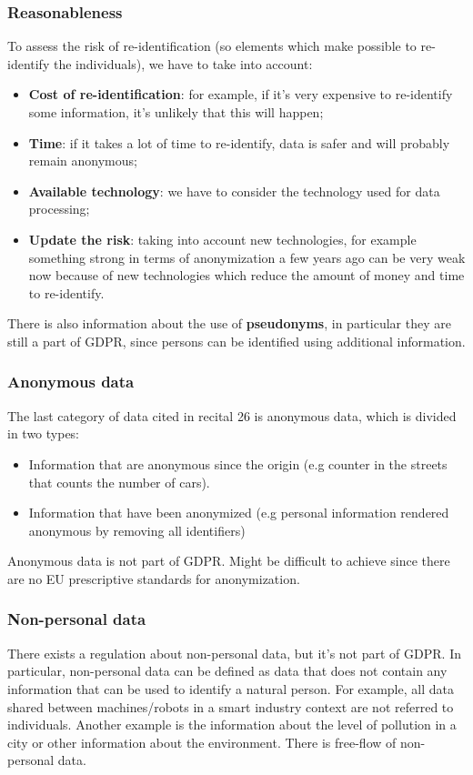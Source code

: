 \subsubsection{Reasonableness}
To assess the risk of re-identification (so elements which make possible to re-identify the individuals), we have to take into account:
\begin{itemize}
    \item \textbf{Cost of re-identification}: for example, if it’s very expensive to re-identify some information, it’s unlikely that this will happen;
    \item \textbf{Time}: if it takes a lot of time to re-identify, data is safer and will probably remain anonymous;
    \item \textbf{Available technology}: we have to consider the technology used for data processing;
    \item \textbf{Update the risk}: taking into account new technologies, for example something strong in terms of anonymization a few years ago can be very weak now because of new technologies which reduce the amount of money and time to re-identify.
\end{itemize}
There is also information about the use of \textbf{pseudonyms}, in particular they are still a part of GDPR, since persons can be identified using additional information.

\subsubsection{Anonymous data}
The last category of data cited in recital 26 is anonymous data, which is divided in two types:
\begin{itemize}
    \item Information that are anonymous since the origin (e.g counter in the streets that counts the number of cars).
    \item Information that have been anonymized (e.g personal information rendered anonymous by removing all identifiers)
\end{itemize}
Anonymous data is not part of GDPR. Might be difficult to achieve since there are no EU prescriptive standards for anonymization.

\subsubsection{Non-personal data}
There exists a regulation about non-personal data, but it's not part of GDPR. In particular, non-personal data can be defined as data that does not contain any information that can be used to identify a natural person. For example, all data shared between machines/robots in a smart industry context are not referred to individuals. Another example is the information about the level of pollution in a city or other information about the environment. There is free-flow of non-personal data.

